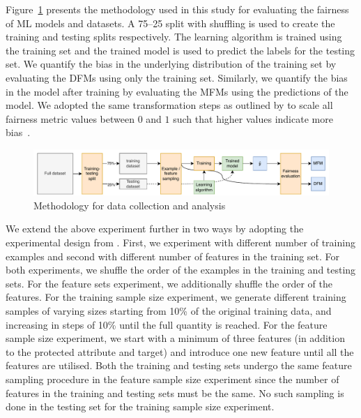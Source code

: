 \documentclass{article}
\begin{document}
Figure \ref{fig:method} presents the methodology used in this study
for evaluating the fairness of ML models and datasets. A 75--25 split
with shuffling is used to create the training and testing splits
respectively. The learning algorithm is trained using the training set
and the trained model is used to predict the labels for the testing
set. We quantify the bias in the underlying distribution of the
training set by evaluating the DFMs using only the training
set. Similarly, we quantify the bias in the model after training by
evaluating the MFMs using the predictions of the model. We adopted the
same transformation steps as outlined by
\citeauthor{zhang2021ignorance} to scale all fairness metric values
between $0$ and $1$ such that higher values indicate more
bias \cite{zhang2021ignorance}.

\begin{figure}
  \centering
  \includegraphics[width=0.95\linewidth]{method.pdf}
  \caption{Methodology for data collection and analysis}
  \label{fig:method}
\end{figure}

We extend the above experiment further in two ways by adopting the
experimental design from \citeauthor{zhang2021ignorance}. First, we
experiment with different number of training examples and second with
different number of features in the training set. For both
experiments, we shuffle the order of the examples in the training and
testing sets. For the feature sets experiment, we additionally shuffle
the order of the features. For the training sample size experiment, we
generate different training samples of varying sizes starting from
10\% of the original training data, and increasing in steps of 10\%
until the full quantity is reached. For the feature sample size
experiment, we start with a minimum of three features (in addition to
the protected attribute and target) and introduce one new feature
until all the features are utilised. Both the training and testing
sets undergo the same feature sampling procedure in the feature sample
size experiment since the number of features in the training and
testing sets must be the same. No such sampling is done in the testing
set for the training sample size experiment.
\end{document}
